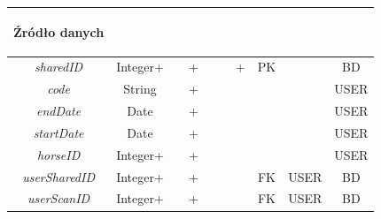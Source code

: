 \documentclass[12pt,twoside]{report}
\begin{document}
\begin{enumerate}[start=10,label={\bfseries REL\textbackslash\arabic*}]
\begin{table}[H]
\begin{tabular}{|c|c|c|c|c|c|c|c|c|c|}
			\begin{sideways}Źródło danych\end{sideways}\\
			\hline			
			\textit{sharedID}&Integer+&&+&&&+&PK&&BD\\
			\hline			
			\textit{code}&String&&+&&&&&&USER\\				
			\hline			
			\textit{endDate}&Date&&+&&&&&&USER\\
			\hline			
			\textit{startDate}&Date&&+&&&&&&USER\\				
			\hline
			\textit{horseID}&Integer+&&+&&&&&&USER\\				
			\hline
			\textit{userSharedID}&Integer+&&+&&&&FK&USER&BD\\				
			\hline
			\textit{userScanID}&Integer+&&+&&&&FK&USER&BD\\	
			\hline
		\end{tabular}
	\end{table}
	

\end{enumerate}
\end{document}
